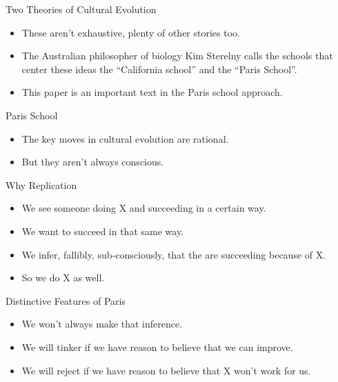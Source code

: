 \documentclass[
  17pt,
  letterpaper,
  ignorenonframetext,
  aspectratio=169,
]{beamer}
\providecommand{\tightlist}{%
  \setlength{\itemsep}{0pt}\setlength{\parskip}{0pt}}\usepackage{longtable,booktabs,array}
\begin{document}
\begin{frame}{Two Theories of Cultural Evolution}
\protect\hypertarget{two-theories-of-cultural-evolution-1}{}
\begin{itemize}[<+->]
\tightlist
\item
  These aren't exhaustive, plenty of other stories too.
\item
  The Australian philosopher of biology Kim Sterelny calls the schools
  that center these ideas the ``California school'' and the ``Paris
  School''.
\item
  This paper is an important text in the Paris school approach.
\end{itemize}
\end{frame}

\begin{frame}{Paris School}
\protect\hypertarget{paris-school}{}
\begin{itemize}[<+->]
\tightlist
\item
  The key moves in cultural evolution are rational.
\item
  But they aren't always conscious.
\end{itemize}
\end{frame}

\begin{frame}{Why Replication}
\protect\hypertarget{why-replication}{}
\begin{itemize}[<+->]
\tightlist
\item
  We see someone doing X and succeeding in a certain way.
\item
  We want to succeed in that same way.
\item
  We infer, fallibly, sub-consciously, that the are succeeding because
  of X.
\item
  So we do X as well.
\end{itemize}
\end{frame}

\begin{frame}{Distinctive Features of Paris}
\protect\hypertarget{distinctive-features-of-paris}{}
\begin{itemize}[<+->]
\tightlist
\item
  We won't always make that inference.
\item
  We will tinker if we have reason to believe that we can improve.
\item
  We will reject if we have reason to believe that X won't work for us.
\end{itemize}
\end{frame}
\end{document}
